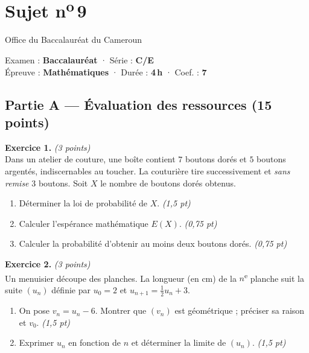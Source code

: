 \section{Sujet n\textsuperscript{o}\,9}
\noindent\begin{minipage}{0.5\linewidth}\footnotesize Office du Baccalauréat du Cameroun\end{minipage}%
\hfill\begin{minipage}{0.45\linewidth}\footnotesize\raggedleft Examen : \textbf{Baccalauréat} · Série : \textbf{C/E}\\
Épreuve : \textbf{Mathématiques} · Durée : \textbf{4\,h} · Coef. : \textbf{7}\end{minipage}
\par\smallskip{\color{onbo}\rule{\linewidth}{1pt}}

\subsection*{Partie A — Évaluation des ressources \hfill (15 points)}

\noindent\textbf{Exercice 1.} \hfill\textit{(3 points)}\\
Dans un atelier de couture, une boîte contient $7$ boutons dorés et $5$ boutons argentés,
indiscernables au toucher. La couturière tire successivement et \emph{sans remise} $3$ boutons.
Soit $X$ le nombre de boutons dorés obtenus.
\begin{enumerate}[label=\arabic*)]
\item Déterminer la loi de probabilité de $X$. \hfill\textit{(1,5 pt)}
\item Calculer l'espérance mathématique $E(X)$. \hfill\textit{(0,75 pt)}
\item Calculer la probabilité d'obtenir au moins deux boutons dorés. \hfill\textit{(0,75 pt)}
\end{enumerate}

\smallskip
\noindent\textbf{Exercice 2.} \hfill\textit{(3 points)}\\
Un menuisier découpe des planches. La longueur (en cm) de la $n$\textsuperscript{e} planche
suit la suite $(u_n)$ définie par $u_0=2$ et $u_{n+1}=\tfrac12 u_n+3$.
\begin{enumerate}[label=\arabic*)]
\item On pose $v_n=u_n-6$. Montrer que $(v_n)$ est géométrique ; préciser sa raison et $v_0$. \hfill\textit{(1,5 pt)}
\item Exprimer $u_n$ en fonction de $n$ et déterminer la limite de $(u_n)$. \hfill\textit{(1,5 pt)}
\end{enumerate}

